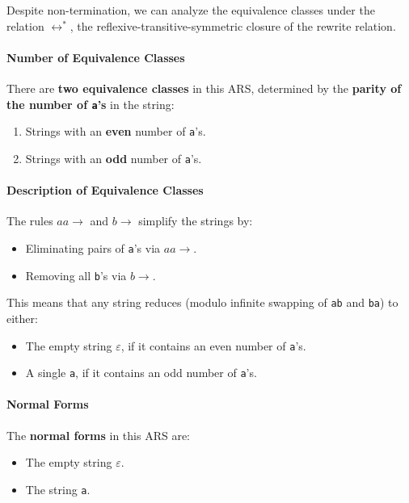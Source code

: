 \documentclass{article}
\begin{document}
Despite non-termination, we can analyze the equivalence classes under the relation $\leftrightarrow^*$, the reflexive-transitive-symmetric closure of the rewrite relation.

\paragraph{Number of Equivalence Classes}

There are \textbf{two equivalence classes} in this ARS, determined by the \textbf{parity of the number of \texttt{a}'s} in the string:

\begin{enumerate}
    \item Strings with an \textbf{even} number of \texttt{a}'s.
    \item Strings with an \textbf{odd} number of \texttt{a}'s.
\end{enumerate}

\paragraph{Description of Equivalence Classes}

The rules $aa \to$ and $b \to$ simplify the strings by:

\begin{itemize}
    \item Eliminating pairs of \texttt{a}'s via $aa \to$.
    \item Removing all \texttt{b}'s via $b \to$.
\end{itemize}

This means that any string reduces (modulo infinite swapping of \texttt{ab} and \texttt{ba}) to either:

\begin{itemize}
    \item The empty string $\varepsilon$, if it contains an even number of \texttt{a}'s.
    \item A single \texttt{a}, if it contains an odd number of \texttt{a}'s.
\end{itemize}

\paragraph{Normal Forms}

The \textbf{normal forms} in this ARS are:

\begin{itemize}
    \item The empty string $\varepsilon$.
    \item The string \texttt{a}.
\end{itemize}
\end{document}
